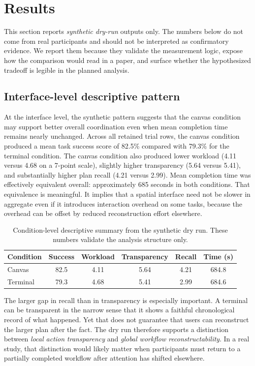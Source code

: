 \documentclass[sigconf]{acmart}
\begin{document}
\section{Results}
This section reports \emph{synthetic dry-run} outputs only. The numbers below do not come from real participants and should not be interpreted as confirmatory evidence. We report them because they validate the measurement logic, expose how the comparison would read in a paper, and surface whether the hypothesized tradeoff is legible in the planned analysis.

\subsection{Interface-level descriptive pattern}

At the interface level, the synthetic pattern suggests that the canvas condition may support better overall coordination even when mean completion time remains nearly unchanged. Across all retained trial rows, the canvas condition produced a mean task success score of 82.5\% compared with 79.3\% for the terminal condition. The canvas condition also produced lower workload (4.11 versus 4.68 on a 7-point scale), slightly higher transparency (5.64 versus 5.41), and substantially higher plan recall (4.21 versus 2.99). Mean completion time was effectively equivalent overall: approximately 685 seconds in both conditions. That equivalence is meaningful. It implies that a spatial interface need not be slower in aggregate even if it introduces interaction overhead on some tasks, because the overhead can be offset by reduced reconstruction effort elsewhere.

\begin{table}[t]
\caption{Condition-level descriptive summary from the synthetic dry run. These numbers validate the analysis structure only.}
\label{tab:overall}
\begin{tabular}{lccccc}
\hline
Condition & Success & Workload & Transparency & Recall & Time (s) \\
\hline
Canvas & 82.5 & 4.11 & 5.64 & 4.21 & 684.8 \\
Terminal & 79.3 & 4.68 & 5.41 & 2.99 & 684.6 \\
\hline
\end{tabular}
\end{table}

The larger gap in recall than in transparency is especially important. A terminal can be transparent in the narrow sense that it shows a faithful chronological record of what happened. Yet that does not guarantee that users can reconstruct the larger plan after the fact. The dry run therefore supports a distinction between \emph{local action transparency} and \emph{global workflow reconstructability}. In a real study, that distinction would likely matter when participants must return to a partially completed workflow after attention has shifted elsewhere.
\end{document}
